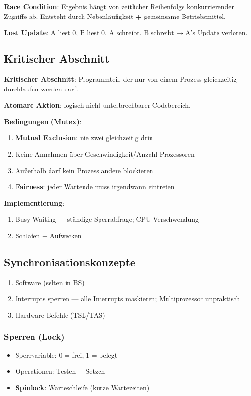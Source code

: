 \documentclass[11pt, a4paper]{article}
\begin{document}
\textbf{Race Condition}: Ergebnis hängt von zeitlicher Reihenfolge konkurrierender Zugriffe ab. Entsteht durch Nebenläufigkeit \textbf{+} gemeinsame Betriebsmittel.


\textbf{Lost Update}: A liest 0, B liest 0, A schreibt, B schreibt → A's Update verloren.



\subsection{Kritischer Abschnitt}

\textbf{Kritischer Abschnitt}: Programmteil, der nur von einem Prozess gleichzeitig durchlaufen werden darf.


\textbf{Atomare Aktion}: logisch nicht unterbrechbarer Codebereich.


\textbf{Bedingungen (Mutex)}:

\begin{enumerate}
  \item \textbf{Mutual Exclusion}: nie zwei gleichzeitig drin
  \item Keine Annahmen über Geschwindigkeit/Anzahl Prozessoren
  \item Außerhalb darf kein Prozess andere blockieren
  \item \textbf{Fairness}: jeder Wartende muss irgendwann eintreten
\end{enumerate}

\textbf{Implementierung}:

\begin{enumerate}
  \item Busy Waiting — ständige Sperrabfrage; CPU-Verschwendung
  \item Schlafen + Aufwecken
\end{enumerate}


\subsection{Synchronisationskonzepte}

\begin{enumerate}
  \item Software (selten in BS)
  \item Interrupts sperren — alle Interrupts maskieren; Multiprozessor unpraktisch
  \item Hardware-Befehle (TSL/TAS)
\end{enumerate}


\subsubsection{Sperren (Lock)}
\begin{itemize}
  \item Sperrvariable: 0 = frei, 1 = belegt
  \item Operationen: Testen + Setzen
  \item \textbf{Spinlock}: Warteschleife (kurze Wartezeiten)
\end{itemize}
\end{document}
